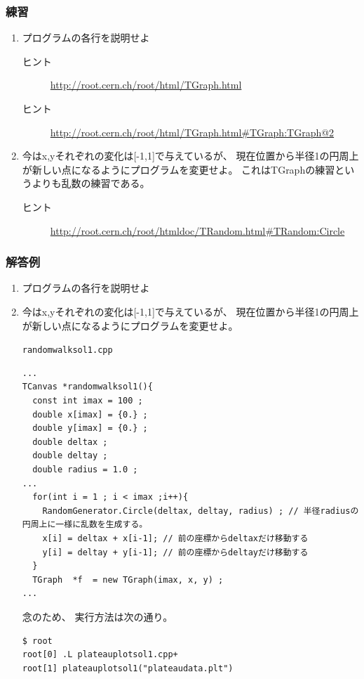 \subsubsection{練習}
\begin{enumerate}
 \item プログラムの各行を説明せよ
   \begin{description}
    \item[ヒント] \url{http://root.cern.ch/root/html/TGraph.html}
    \item[ヒント] \url{http://root.cern.ch/root/html/TGraph.html#TGraph:TGraph@2}
   \end{description}
 \item 今はx,yそれぞれの変化は[-1,1]で与えているが、
       現在位置から半径1の円周上が新しい点になるようにプログラムを変更せよ。
       これはTGraphの練習というよりも乱数の練習である。
   \begin{description}
    \item[ヒント] \url{http://root.cern.ch/root/htmldoc/TRandom.html#TRandom:Circle}
   \end{description}
       
\end{enumerate}

\subsubsection{解答例}

\begin{enumerate}
 \item プログラムの各行を説明せよ
 \item 今はx,yそれぞれの変化は[-1,1]で与えているが、
       現在位置から半径1の円周上が新しい点になるようにプログラムを変更せよ。
       \begin{itembox}{\texttt{randomwalksol1.cpp}}
\begin{verbatim}
...
TCanvas *randomwalksol1(){
  const int imax = 100 ;
  double x[imax] = {0.} ;
  double y[imax] = {0.} ;
  double deltax ;
  double deltay ;
  double radius = 1.0 ;
...
  for(int i = 1 ; i < imax ;i++){
    RandomGenerator.Circle(deltax, deltay, radius) ; // 半径radiusの円周上に一様に乱数を生成する。
    x[i] = deltax + x[i-1]; // 前の座標からdeltaxだけ移動する
    y[i] = deltay + y[i-1]; // 前の座標からdeltayだけ移動する
  }
  TGraph  *f  = new TGraph(imax, x, y) ;
...
\end{verbatim}
       \end{itembox}
念のため、
実行方法は次の通り。
\begin{verbatim}
$ root
root[0] .L plateauplotsol1.cpp+
root[1] plateauplotsol1("plateaudata.plt")
\end{verbatim}
\end{enumerate}
